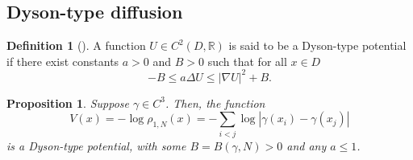 \documentclass[11pt]{article}
\numberwithin{equation}{section}
\newtheorem{proposition}[theorem]{Proposition}
\theoremstyle{definition}
\newtheorem{definition}[theorem]{Definition}
\begin{document}
\subsection{Dyson-type diffusion}
\begin{definition}[\cite{abuzaid2024large}]\label{def::Dyson-type-potential}
 A function $U\in C^2(D,\mathbb{R})$ is said to be a Dyson-type potential if there exist constants $a>0$ and $B>0$ such that for all $x\in D$
\begin{equation}\label{eq::Dyson_type_potential}
    -B \le a\Delta U\le |\nabla U|^{2}+B.
\end{equation}
\end{definition}

\begin{proposition}
Suppose $\gamma\in C^{3}$. Then, the function 
\[
    V(x) = -\log\rho_{1,N}(x) =   - \sum_{i<j}\log|\gamma(x_{i})-\gamma(x_{j})|    
\]
is a Dyson-type potential, with some $B=B(\gamma, N)>0$ and any $a\le1$.
\end{proposition}
\end{document}
